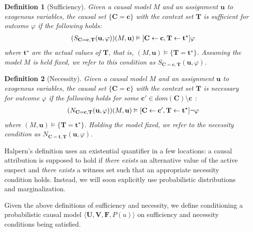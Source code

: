 \documentclass[twoside,11pt]{article}
\newtheorem{definition}{Definition}
\begin{document}
\begin{definition}[Sufficiency]
    Given a causal model \(M\) and an assignment \(\mathbf{u}\) to exogenous variables, the causal set \(\{\mathbf{C} = \mathbf{c}\}\) with the context set $\mathbf{T}$ is \textit{sufficient} for outcome \(\varphi\) if the following holds:
    \begin{align}
    \tag{$S_{\mathbf{C} = \mathbf{c}, \mathbf{T}}(\mathbf{u}, \varphi)$}
    (M, \mathbf{u}) 
    \vDash [\mathbf{C} \leftarrow \mathbf{c}, \mathbf{T} \leftarrow \mathbf{t}^\star]\varphi
    \end{align}
     where $\mathbf{t}^\star$ are the actual values of $\mathbf{T}$, that is, \((M, \mathbf{u}) \vDash \{\mathbf{T} = \mathbf{t}^\star\}\). Assuming the model $M$ is held fixed,  we refer to this condition as \(S_{\mathbf{C} = \mathbf{c}, \mathbf{T}}(\mathbf{u}, \varphi)\).

\end{definition}

\begin{definition}[Necessity]
    Given a causal model \(M\) and an assignment \(\mathbf{u}\) to exogenous variables, the causal set \(\{\mathbf{C} = \mathbf{c}\}\) with the context set $\mathbf{T}$ is \textit{necessary} for outcome \(\varphi\) if the following holds for some  \(\mathbf{c'} \in \mathit{dom}(\mathbf{C})\setminus \mathbf{c}\) :
    \begin{align} \label{eq:nec}
        \tag{\(N_{\mathbf{C} = \mathbf{c}, \mathbf{T}}(\mathbf{u}, \varphi)\)}
    (M, \mathbf{u}) \vDash [\mathbf{C} \leftarrow \mathbf{c'}, \mathbf{T} \leftarrow \mathbf{t}^\star]\neg \varphi\end{align}
    where \((M, \mathbf{u}) \vDash \{\mathbf{T} = \mathbf{t}^\star\}\).
    Holding the model fixed, we refer to the necessity condition as \(N_{\mathbf{C} = \mathbf{t}, \mathbf{T}}(\mathbf{u}, \varphi)\).
\end{definition}

 Halpern's definition uses an existential quantifier in a few locations: a causal attribution is supposed to hold if \emph{there exists} an alternative value of the active suspect and \emph{there exists} a witness set such that an appropriate necessity condition holds.
 Instead, we will soon explicitly use probabilistic distributions and marginalization.


Given the above definitions of sufficiency and necessity, we define conditioning a probabilistic causal model \(\langle \mathbf{U}, \mathbf{V}, \mathbf{F}, P(u) \rangle\) on sufficiency and necessity conditions being satisfied.
\end{document}
